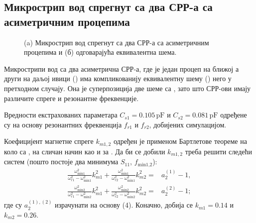 \documentclass[main.tex]{subfiles}
\begin{document}
\subsection{\label{sec:ML2SP}
Микрострип вод спрегнут са два СРР-а са асиметричним процепима}
\begin{figure}[!t]
\caption{(a) Микрострип вод спрегнут са два СРР-а са асиметричним процепима и (б) одговарајућа еквивалентна шема.}
\label{f6}
\end{figure}
Микрострипи вод са два асиметрична СРР-а, где је један процеп на ближој а други на даљој ивици () има компликованију еквивалентну шему () него у претходном случају. Она је суперпозиција две шеме са , зато што СРР-ови имају различите спреге и резонантне фреквенције. 

Вредности екстрахованих параметара $C_{s1}=\num{0.105}\, \mathrm{pF}$ и $C_{s2}=\num{0.081}\,
\mathrm{pF}$ одређене су на основу резонантних фреквенција $f_{r1}$ и $f_{r2}$, добијених симулацијом.

Коефицијент магнетне спреге $k_{m1,2}$  одређен је применом Бартлетове теореме на коло са , на сличан начин као и за . Да би се добили $k_{m1,2}$ треба решити следећи систем (пошто постоје два минимума $S_{11}$, $f_\text{min1,2}$):
\begin{equation}
\begin{split}
\frac{\omega_\text{min1}^2}{\omega_{r1}^2-\omega_\text{min1}^2}k_{m1}^2 +
\frac{\omega_\text{min1}^2}{\omega_{r2}^2-\omega_\text{min1}^2}k_{m2}^2 = & a_2^{(1)} -1, \\
\frac{\omega_\text{min2}^2}{\omega_{r1}^2-\omega_\text{min2}^2}k_{m1}^2 +
\frac{\omega_\text{min2}^2}{\omega_{r2}^2-\omega_\text{min2}^2}k_{m2}^2 = & a_2^{(2)} -1;
\end{split}
\end{equation}
где су $a_2^{(1),(2)}$ израчунати на основу (4). Коначно, добија се $k_{m1}=\num{0.14}$ и $k_{m2}=\num{0.26}$.
\end{document}
